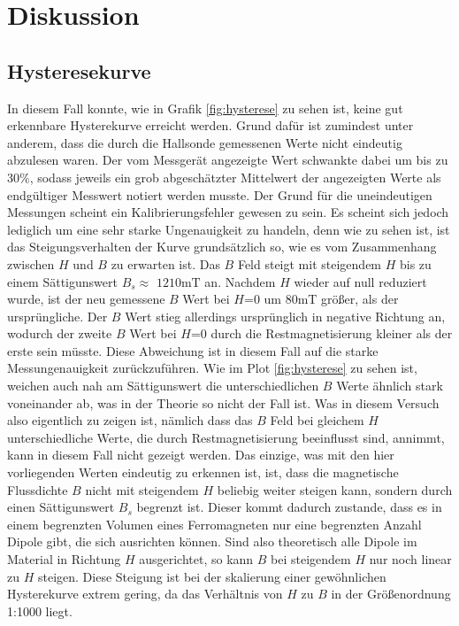 \section{Diskussion}
\label{sec:Diskussion}

\subsection{Hysteresekurve}
    In diesem Fall konnte, wie in Grafik \ref{fig:hysterese} zu 
    sehen ist, keine gut erkennbare Hysterekurve erreicht werden. 
    Grund dafür ist zumindest unter anderem, dass die durch die Hallsonde
    gemessenen Werte nicht eindeutig abzulesen waren. Der vom Messgerät angezeigte
    Wert schwankte dabei um bis zu 30\%, sodass jeweils ein grob abgeschätzter 
    Mittelwert der angezeigten Werte als endgültiger Messwert notiert werden musste.
    Der Grund für die uneindeutigen Messungen scheint ein Kalibrierungsfehler gewesen zu sein.
    Es scheint sich jedoch lediglich um eine sehr starke Ungenauigkeit zu handeln, denn wie 
    zu sehen ist, ist das Steigungsverhalten der Kurve grundsätzlich so, wie es vom Zusammenhang 
    zwischen $H$ und $B$ zu erwarten ist. Das $B$ Feld steigt mit steigendem $H$
    bis zu einem Sättigunswert $B_s \approx$ $1210\si{\milli\tesla}$ an. Nachdem $H$ wieder
    auf null reduziert wurde, ist der neu gemessene $B$ Wert bei $H$=0 um 80\si{\milli\tesla} 
    größer, als der ursprüngliche. Der $B$ Wert stieg allerdings ursprünglich in negative Richtung an,
    wodurch der zweite $B$ Wert bei $H$=0 durch die Restmagnetisierung kleiner als der erste sein müsste.
    Diese Abweichung ist in diesem Fall auf die starke Messungenauigkeit zurückzuführen. Wie im Plot \ref{fig:hysterese} zu sehen ist,
    weichen auch nah am Sättigunswert die unterschiedlichen $B$ Werte ähnlich stark voneinander ab, was in der Theorie
    so nicht der Fall ist. Was in diesem Versuch also eigentlich zu zeigen ist, nämlich dass das $B$ Feld bei gleichem
    $H$ unterschiedliche Werte, die durch Restmagnetisierung beeinflusst sind, annimmt, kann in diesem Fall nicht gezeigt
    werden. Das einzige, was mit den hier vorliegenden Werten eindeutig zu erkennen ist, ist, dass die magnetische 
    Flussdichte $B$ nicht mit steigendem $H$ beliebig weiter steigen kann, sondern durch einen Sättigunswert $B_s$
    begrenzt ist. Dieser kommt dadurch zustande, dass es in einem begrenzten Volumen eines Ferromagneten nur eine begrenzten
    Anzahl Dipole gibt, die sich ausrichten können. Sind also theoretisch alle Dipole im Material in Richtung $H$
    ausgerichtet, so kann $B$ bei steigendem $H$ nur noch linear zu $H$ steigen. Diese Steigung ist
    bei der skalierung einer gewöhnlichen Hysterekurve extrem gering, da das Verhältnis von $H$ zu $B$ in der 
    Größenordnung 1:1000 liegt. %

